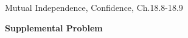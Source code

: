 \documentclass[handout]{mcs}
\begin{document}
\begin{staffnotes}
Mutual Independence, Confidence, Ch.18.8-18.9
\end{staffnotes}






\begin{center}
\textbf{Supplemental Problem}
\end{center}




\end{document}
